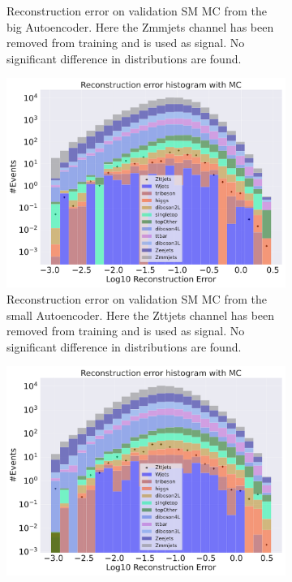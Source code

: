 \begin{figure}[H]
\begin{subfigure}{.45\textwidth}
        \caption{Reconstruction error on validation SM MC from the big Autoencoder. Here the Zmmjets channel has been removed from training and 
        is used as signal. No significant difference in distributions are found. }
        \label{fig:vae_big_Zmmjets}
    \end{subfigure}
    \hfill
    \begin{subfigure}{.45\textwidth}
        \includegraphics[width=\textwidth]{Figures/VAE_testing/small/b_data_recon_big_rm3_feats_sig_Zttjets.pdf}
        \caption{Reconstruction error on validation SM MC from the small Autoencoder. Here the Zttjets channel has been removed from training and 
        is used as signal. No significant difference in distributions are found. }
        \label{fig:vae_small_Zttjets}
    \end{subfigure}
    \hfill 
    \begin{subfigure}{.45\textwidth}
        \includegraphics[width=\textwidth]{Figures/VAE_testing/big/b_data_recon_big_rm3_feats_sig_Zttjets.pdf}

\end{subfigure}
\end{figure}
